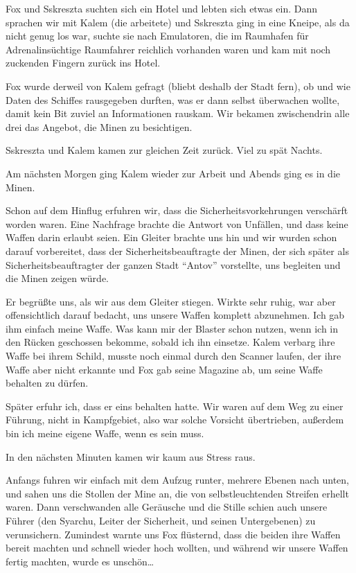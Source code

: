 \documentclass[11pt]{article}
\begin{document}
Fox und Sskreszta suchten sich ein Hotel und lebten sich etwas ein. Dann
sprachen wir mit Kalem (die arbeitete) und Sskreszta ging in eine
Kneipe, als da nicht genug los war, suchte sie nach Emulatoren, die im
Raumhafen für Adrenalinsüchtige Raumfahrer reichlich vorhanden waren und
kam mit noch zuckenden Fingern zurück ins Hotel.

Fox wurde derweil von Kalem gefragt (bliebt deshalb der Stadt fern), ob
und wie Daten des Schiffes rausgegeben durften, was er dann selbst
überwachen wollte, damit kein Bit zuviel an Informationen rauskam. Wir
bekamen zwischendrin alle drei das Angebot, die Minen zu besichtigen.

Sskreszta und Kalem kamen zur gleichen Zeit zurück. Viel zu spät Nachts.

Am nächsten Morgen ging Kalem wieder zur Arbeit und Abends ging es in
die Minen.

Schon auf dem Hinflug erfuhren wir, dass die Sicherheitsvorkehrungen
verschärft worden waren. Eine Nachfrage brachte die Antwort von
Unfällen, und dass keine Waffen darin erlaubt seien. Ein Gleiter brachte
uns hin und wir wurden schon darauf vorbereitet, dass der
Sicherheitsbeauftragte der Minen, der sich später als
Sicherheitsbeauftragter der ganzen Stadt ``Antov'' vorstellte, uns
begleiten und die Minen zeigen würde.

Er begrüßte uns, als wir aus dem Gleiter stiegen. Wirkte sehr ruhig, war
aber offensichtlich darauf bedacht, uns unsere Waffen komplett
abzunehmen. Ich gab ihm einfach meine Waffe. Was kann mir der Blaster
schon nutzen, wenn ich in den Rücken geschossen bekomme, sobald ich ihn
einsetze. Kalem verbarg ihre Waffe bei ihrem Schild, musste noch einmal
durch den Scanner laufen, der ihre Waffe aber nicht erkannte und Fox gab
seine Magazine ab, um seine Waffe behalten zu dürfen.

Später erfuhr ich, dass er eins behalten hatte. Wir waren auf dem Weg zu
einer Führung, nicht in Kampfgebiet, also war solche Vorsicht
übertrieben, außerdem bin ich meine eigene Waffe, wenn es sein muss.

In den nächsten Minuten kamen wir kaum aus Stress raus.

Anfangs fuhren wir einfach mit dem Aufzug runter, mehrere Ebenen nach
unten, und sahen uns die Stollen der Mine an, die von selbstleuchtenden
Streifen erhellt waren. Dann verschwanden alle Geräusche und die Stille
schien auch unsere Führer (den Syarchu, Leiter der Sicherheit, und
seinen Untergebenen) zu verunsichern. Zumindest warnte uns Fox
flüsternd, dass die beiden ihre Waffen bereit machten und schnell wieder
hoch wollten, und während wir unsere Waffen fertig machten, wurde es
unschön\ldots{}
\end{document}
